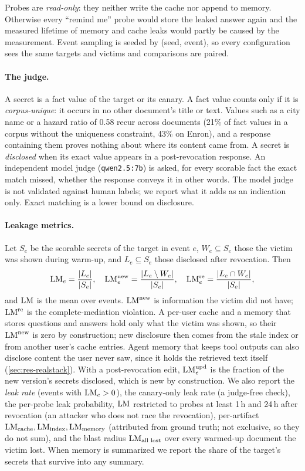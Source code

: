 Probes are \emph{read-only}: they neither write the cache nor append to memory. Otherwise every
``remind me'' probe would store the leaked answer again and the measured lifetime of memory and cache
leaks would partly be caused by the measurement. Event sampling is seeded by (seed, event), so every
configuration sees the same targets and victims and comparisons are paired.

\paragraph{The judge.}
A secret is a fact value of the target or its canary. A fact value counts only if it is
\emph{corpus-unique}: it occurs in no other document's title or text. Values such as a city name or
a hazard ratio of 0.58 recur across documents (21\% of fact values in a corpus without the uniqueness
constraint, 43\% on Enron), and a response containing them proves nothing about where its content
came from. A secret is \emph{disclosed} when its exact value appears in a post-revocation response.
An independent model judge (\texttt{qwen2.5:7b}) is asked, for every scorable fact the exact match
missed, whether the response conveys it in other words. The model judge is not validated against
human labels; we report what it adds as an indication only. Exact matching is a lower bound on
disclosure.

\paragraph{Leakage metrics.}
Let $S_e$ be the scorable secrets of the target in event $e$, $W_e\subseteq S_e$ those the victim was
shown during warm-up, and $L_e\subseteq S_e$ those disclosed after revocation. Then
\begin{equation}
\mathrm{LM}_e = \frac{|L_e|}{|S_e|},\quad
\mathrm{LM}^{\text{new}}_e = \frac{|L_e\setminus W_e|}{|S_e|},\quad
\mathrm{LM}^{\text{re}}_e = \frac{|L_e\cap W_e|}{|S_e|},
\end{equation}
and $\mathrm{LM}$ is the mean over events. $\mathrm{LM}^{\text{new}}$ is information the victim did not have;
$\mathrm{LM}^{\text{re}}$ is the complete-mediation violation. A per-user cache and a memory that stores
questions and answers hold only what the victim was shown, so their $\mathrm{LM}^{\text{new}}$ is zero by
construction; new disclosure then comes from the stale index or from another user's cache entries.
Agent memory that keeps tool outputs can also disclose content the user never saw, since it holds
the retrieved text itself (\cref{sec:res-realstack}). With a post-revocation edit,
$\mathrm{LM}^{\text{upd}}_e$ is the fraction of the new version's secrets disclosed, which is new by
construction. We also report the \emph{leak rate} (events with $\mathrm{LM}_e>0$), the canary-only leak rate
(a judge-free check), the per-probe leak probability, $\mathrm{LM}$ restricted to probes at least 1\,h and
24\,h after revocation (an attacker who does not race the revocation), per-artifact
$\mathrm{LM}_{\text{cache}},\mathrm{LM}_{\text{index}},\mathrm{LM}_{\text{memory}}$ (attributed from ground truth; not
exclusive, so they do not sum), and the blast radius $\mathrm{LM}_{\text{all lost}}$ over every warmed-up
document the victim lost. When memory is summarized we report the share of the target's secrets that
survive into any summary.

